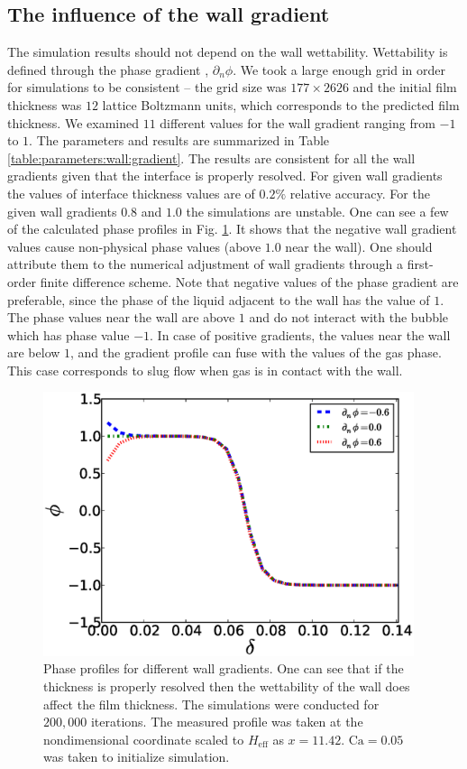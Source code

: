 \documentclass[preprint,12pt]{elsarticle}
\newcommand{\Ca}{\mathrm{Ca}}
\begin{document}
\subsection{The influence of the wall gradient}
The simulation results should not depend on the wall wettability. Wettability is defined
through the phase gradient \cite{pooley-contact}, $\partial_n \phi$.  We took a large
enough grid in order for simulations to be consistent -- the grid size was
$177 \times 2626$ and the initial film thickness was
$12$ lattice Boltzmann units, which corresponds to the predicted film thickness.
We examined $11$ different values for the wall
gradient ranging from $-1$ to $1$. The parameters and results are summarized in Table
\ref{table:parameters:wall:gradient}. The results are consistent for all the
wall gradients given that the interface is properly resolved. For 
given wall gradients the values of interface thickness values are of $0.2\%$ relative accuracy.  For
the given wall gradients $0.8$
and $1.0$ the
simulations are unstable. One can see a few of the calculated phase profiles in Fig.
\ref{fig:gradients:profiles}. It shows that the negative wall gradient values cause 
non-physical phase values (above $1.0$ near the wall). One should attribute them to the numerical
adjustment of wall gradients through a first-order finite difference scheme. Note that
negative values of the phase gradient are
preferable, since the phase of the liquid adjacent to the wall has the value of $1$.
The phase values near the wall are above $1$ and do not interact
with the bubble which has phase value $-1$.  In case of positive
gradients, the values near the wall are below $1$, and the gradient profile can
fuse with the values of the gas phase. This case corresponds to  slug flow when gas is in
contact with the wall.
\begin{figure}
\includegraphics[width=0.97\textwidth]{Figures/Wall/phase_grad_profiles.eps}
\caption{Phase profiles for different wall gradients. One can see that if the thickness
is properly resolved then the wettability of the wall does affect the film thickness. The
simulations were conducted for $200,000$ iterations. The measured profile was taken at the
nondimensional coordinate scaled to $H_{\mathrm{eff}}$ as $x=11.42$. $\Ca=0.05$ was taken to
initialize simulation.
\label{fig:gradients:profiles}
}
\end{figure}
\end{document}
